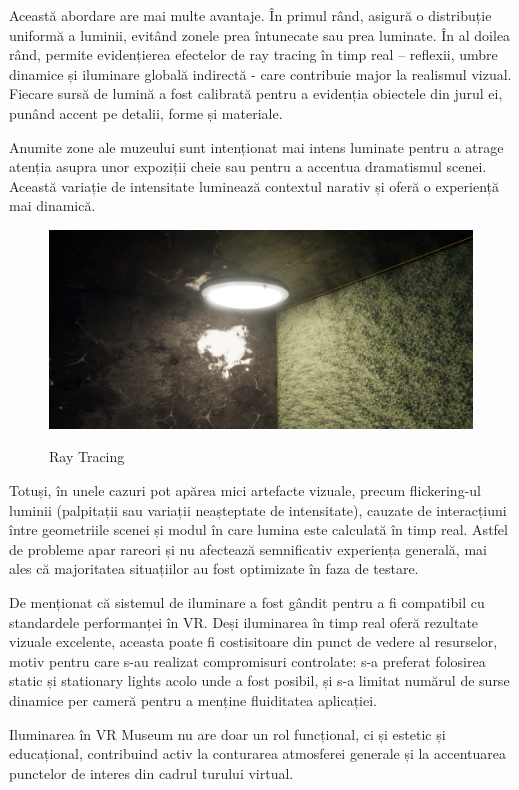 Această abordare are mai multe avantaje. În primul rând, asigură o distribuție uniformă a luminii, evitând zonele prea întunecate sau prea luminate. În al doilea rând, permite evidențierea efectelor de ray tracing în timp real – reflexii, umbre dinamice și iluminare globală indirectă - care contribuie major la realismul vizual. Fiecare sursă de lumină a fost calibrată pentru a evidenția obiectele din jurul ei, punând accent pe detalii, forme și materiale.

Anumite zone ale muzeului sunt intenționat mai intens luminate pentru a atrage atenția asupra unor expoziții cheie sau pentru a accentua dramatismul scenei. Această variație de intensitate luminează contextul narativ și oferă o experiență mai dinamică.

\begin{figure} [htp] 
\centering 
\includegraphics [width=12cm]
{continut/capitol3/figuri/rayBIMtraced.png} 
\label{fig:Ray Tracing} 
    \caption{Ray Tracing}
\end{figure}

Totuși, în unele cazuri pot apărea mici artefacte vizuale, precum flickering-ul luminii (palpitații sau variații neașteptate de intensitate), cauzate de interacțiuni între geometriile scenei și modul în care lumina este calculată în timp real. Astfel de probleme apar rareori și nu afectează semnificativ experiența generală, mai ales că majoritatea situațiilor au fost optimizate în faza de testare.

De menționat că sistemul de iluminare a fost gândit pentru a fi compatibil cu standardele performanței în VR. Deși iluminarea în timp real oferă rezultate vizuale excelente, aceasta poate fi costisitoare din punct de vedere al resurselor, motiv pentru care s-au realizat compromisuri controlate: s-a preferat folosirea static și stationary lights acolo unde a fost posibil, și s-a limitat numărul de surse dinamice per cameră pentru a menține fluiditatea aplicației.

Iluminarea în VR Museum nu are doar un rol funcțional, ci și estetic și educațional, contribuind activ la conturarea atmosferei generale și la accentuarea punctelor de interes din cadrul turului virtual.

